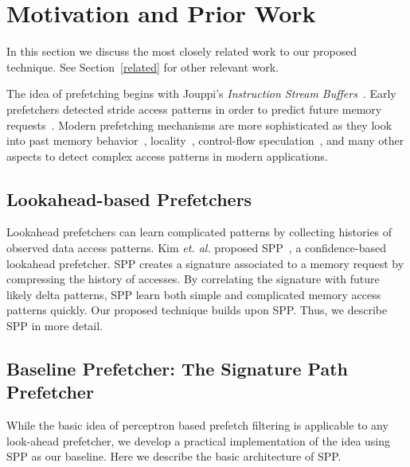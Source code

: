 \section{Motivation and Prior Work}
\label{Background}

In this section we discuss the most closely related work to our proposed
technique. See Section~\ref{related} for other relevant work.

The idea of prefetching begins with Jouppi's \textit{Instruction Stream
Buffers}~\cite{ISB}. Early prefetchers detected stride access patterns in order to
predict future memory requests~\cite{Smith,Baer,Stride}. Modern prefetching
mechanisms are more sophisticated as they look into past memory
behavior~\cite{Address_Correlated,AMPM},
locality~\cite{Spatial_Pattern,SMS,Temporal_Instruction_Fetch,Off_Chip,STMS,SMS_JILP},
control-flow speculation~\cite{BFetch,MTBFetch}, and many other aspects to
detect complex access patterns in modern applications.

\subsection{Lookahead-based Prefetchers}

Lookahead prefetchers can learn complicated patterns by collecting histories of
observed data access patterns.
Kim {\em et. al.} proposed
SPP~\cite{SPP}, a confidence-based lookahead prefetcher. SPP creates a
signature associated to a memory request by compressing the history of
accesses. By correlating the signature with future likely delta patterns, SPP
learn both simple and complicated memory access patterns quickly. Our proposed
technique builds upon SPP. Thus, we describe SPP in more detail.

\subsection{Baseline Prefetcher: The Signature Path Prefetcher}
\label{Background-SPP}

While the basic idea of perceptron based prefetch filtering is applicable to
any look-ahead prefetcher, we develop a practical implementation of the idea
using SPP as our baseline. Here we describe the basic architecture of SPP.\\

